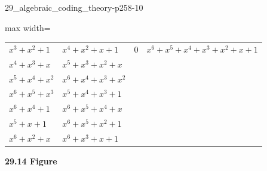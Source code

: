\documentclass[11pt,oneside]{article}
\begin{document}
\begin{BookBody}
\begin{BookFloat}{29_algebraic_coding_theory-p258-10}
\begin{center}\begin{adjustbox}{max width=\linewidth}
\setlength{\tabcolsep}{4pt}\renewcommand{\arraystretch}{1.25}
\begin{tabular}{@{}llll@{}}
$x^3+x^2+1$ & $x^4+x^2+x+1$ & $0$ & $x^6+x^5+x^4+x^3+x^2+x+1$\\
$x^4+x^3+x$ & $x^5+x^3+x^2+x$ & & \\
$x^5+x^4+x^2$ & $x^6+x^4+x^3+x^2$ & & \\
$x^6+x^5+x^3$ & $x^5+x^4+x^3+1$ & & \\
$x^6+x^4+1$ & $x^6+x^5+x^4+x$ & & \\
$x^5+x+1$ & $x^6+x^5+x^2+1$ & & \\
$x^6+x^2+x$ & $x^6+x^3+x+1$ & & \\
\end{tabular}\end{adjustbox}\end{center}
\begin{center}\small \textbf{29.14 Figure}\end{center}
\end{BookFloat}

\end{BookBody}

\BookNarrativetrue
\end{document}

